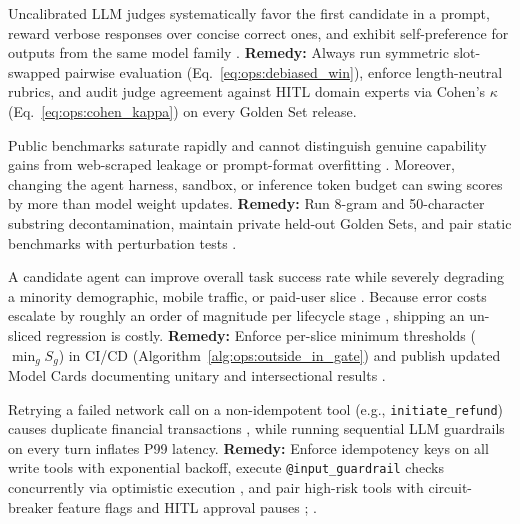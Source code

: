 \documentclass[../../../../master.tex]{subfiles}
\begin{document}
\begin{pitfall}
Uncalibrated LLM judges systematically favor the first candidate in a prompt, reward verbose responses over concise correct ones, and exhibit self-preference for outputs from the same model family . \textbf{Remedy:} Always run symmetric slot-swapped pairwise evaluation (Eq.~\eqref{eq:ops:debiased_win}), enforce length-neutral rubrics, and audit judge agreement against HITL domain experts via Cohen's $\kappa$ (Eq.~\eqref{eq:ops:cohen_kappa}) on every Golden Set release.
\end{pitfall}

\begin{pitfall}
Public benchmarks saturate rapidly and cannot distinguish genuine capability gains from web-scraped leakage or prompt-format overfitting . Moreover, changing the agent harness, sandbox, or inference token budget can swing scores by more than model weight updates. \textbf{Remedy:} Run 8-gram and 50-character substring decontamination, maintain private held-out Golden Sets, and pair static benchmarks with perturbation tests .
\end{pitfall}

\begin{pitfall}
A candidate agent can improve overall task success rate while severely degrading a minority demographic, mobile traffic, or paid-user slice . Because error costs escalate by roughly an order of magnitude per lifecycle stage , shipping an un-sliced regression is costly. \textbf{Remedy:} Enforce per-slice minimum thresholds ($\min_g S_g$) in CI/CD (Algorithm~\ref{alg:ops:outside_in_gate}) and publish updated Model Cards documenting unitary and intersectional results .
\end{pitfall}

\begin{pitfall}
Retrying a failed network call on a non-idempotent tool (e.g., \texttt{initiate\_refund}) causes duplicate financial transactions , while running sequential LLM guardrails on every turn inflates P99 latency. \textbf{Remedy:} Enforce idempotency keys on all write tools with exponential backoff, execute \texttt{@input\_guardrail} checks concurrently via optimistic execution , and pair high-risk tools with circuit-breaker feature flags and HITL approval pauses ; .
\end{pitfall}
\end{document}
